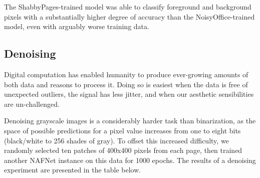 \documentclass[runningheads]{llncs}
\begin{document}
\begin{table}[]
    \centering
    \caption{Document image *binarization* performance of a NAFNet model trained and tested on ShabbyPages and NoisyOffice.}
    \label{tab:binarization_results}
\end{table}

The ShabbyPages-trained model was able to classify foreground and background pixels with a substantially higher degree of accuracy than the NoisyOffice-trained model, even with arguably worse training data.

\subsection{Denoising}
Digital computation has enabled humanity to produce ever-growing amounts of both data and reasons to process it.
Doing so is easiest when the data is free of unexpected outliers, the signal has less jitter, and when our aesthetic sensibilities are un-challenged.

Denoising grayscale images is a considerably harder task than binarization, as the space of possible predictions for a pixel value increases from one to eight bits (black/white to 256 shades of gray).
To offset this increased difficulty, we randomly selected ten patches of 400x400 pixels from each page, then trained another NAFNet instance on this data for 1000 epochs. The results of a denoising experiment are presented in the table below.

\begin{table}[]
    \centering
    \caption{Document image *denoising* cross-test performance of NAFNet models trained on ShabbyPages and NoisyOffice.}
    \label{tab:denoising_results}
\end{table}
\end{document}
